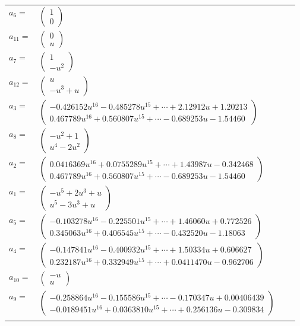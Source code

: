 \documentclass[1p]{elsarticle_modified}
\theoremstyle{definition}
\begin{document}
\begin{tabular}{m{7pt} m{180pt} m{7pt} m{180pt} }
\flushright $a_{6}=$&$\begin{pmatrix}1\\0\end{pmatrix}$ \\
\flushright $a_{11}=$&$\begin{pmatrix}0\\u\end{pmatrix}$ \\
\flushright $a_{7}=$&$\begin{pmatrix}1\\- u^2\end{pmatrix}$ \\
\flushright $a_{12}=$&$\begin{pmatrix}u\\- u^3+u\end{pmatrix}$ \\
\flushright $a_{3}=$&$\begin{pmatrix}-0.426152 u^{16}-0.485278 u^{15}+\cdots+2.12912 u+1.20213\\0.467789 u^{16}+0.560807 u^{15}+\cdots-0.689253 u-1.54460\end{pmatrix}$ \\
\flushright $a_{8}=$&$\begin{pmatrix}- u^2+1\\u^4-2 u^2\end{pmatrix}$ \\
\flushright $a_{2}=$&$\begin{pmatrix}0.0416369 u^{16}+0.0755289 u^{15}+\cdots+1.43987 u-0.342468\\0.467789 u^{16}+0.560807 u^{15}+\cdots-0.689253 u-1.54460\end{pmatrix}$ \\
\flushright $a_{1}=$&$\begin{pmatrix}- u^5+2 u^3+u\\u^5-3 u^3+u\end{pmatrix}$ \\
\flushright $a_{5}=$&$\begin{pmatrix}-0.103278 u^{16}-0.225501 u^{15}+\cdots+1.46060 u+0.772526\\0.345063 u^{16}+0.406545 u^{15}+\cdots-0.432520 u-1.18063\end{pmatrix}$ \\
\flushright $a_{4}=$&$\begin{pmatrix}-0.147841 u^{16}-0.400932 u^{15}+\cdots+1.50334 u+0.606627\\0.232187 u^{16}+0.332949 u^{15}+\cdots+0.0411470 u-0.962706\end{pmatrix}$ \\
\flushright $a_{10}=$&$\begin{pmatrix}- u\\u\end{pmatrix}$ \\
\flushright $a_{9}=$&$\begin{pmatrix}-0.258864 u^{16}-0.155586 u^{15}+\cdots-0.170347 u+0.00406439\\-0.0189451 u^{16}+0.0363810 u^{15}+\cdots+0.256136 u-0.309834\end{pmatrix}$\\&\end{tabular}
\end{document}
